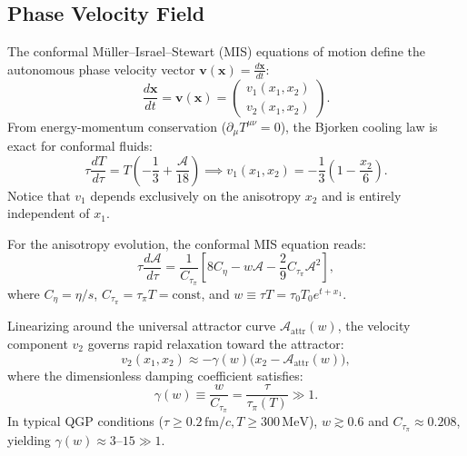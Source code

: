 \documentclass[11pt,a4paper]{article}
\begin{document}
\subsection{Phase Velocity Field}
The conformal Müller--Israel--Stewart (MIS) equations of motion define the autonomous phase velocity vector $\mathbf{v}(\mathbf{x}) = \frac{d\mathbf{x}}{dt}$:
\begin{equation}
    \frac{d\mathbf{x}}{dt} = \mathbf{v}(\mathbf{x}) = \begin{pmatrix} v_1(x_1, x_2) \\ v_2(x_1, x_2) \end{pmatrix}.
\end{equation}
From energy-momentum conservation ($\partial_\mu T^{\mu\nu} = 0$), the Bjorken cooling law is exact for conformal fluids:
\begin{equation}
    \tau \frac{dT}{d\tau} = T \left(-\frac{1}{3} + \frac{\mathcal{A}}{18}\right) \implies v_1(x_1, x_2) = -\frac{1}{3}\left(1 - \frac{x_2}{6}\right).
    \label{eq:v1_definition}
\end{equation}
Notice that $v_1$ depends exclusively on the anisotropy $x_2$ and is entirely independent of $x_1$.

For the anisotropy evolution, the conformal MIS equation reads:
\begin{equation}
    \tau \frac{d\mathcal{A}}{d\tau} = \frac{1}{C_{\tau_\pi}} \left[ 8 C_\eta - w \mathcal{A} - \frac{2}{9} C_{\tau_\pi} \mathcal{A}^2 \right],
    \label{eq:v2_exact}
\end{equation}
where $C_\eta = \eta/s$, $C_{\tau_\pi} = \tau_\pi T = \mathrm{const}$, and $w \equiv \tau T = \tau_0 T_0 e^{t + x_1}$. 

Linearizing around the universal attractor curve $\mathcal{A}_{\mathrm{attr}}(w)$, the velocity component $v_2$ governs rapid relaxation toward the attractor:
\begin{equation}
    v_2(x_1, x_2) \approx -\gamma(w)\big(x_2 - \mathcal{A}_{\mathrm{attr}}(w)\big),
    \label{eq:v2_linearized}
\end{equation}
where the dimensionless damping coefficient satisfies:
\begin{equation}
    \gamma(w) \equiv \frac{w}{C_{\tau_\pi}} = \frac{\tau}{\tau_\pi(T)} \gg 1.
\end{equation}
In typical QGP conditions ($\tau \ge 0.2\,\mathrm{fm}/c, T \ge 300\,\mathrm{MeV}$), $w \gtrsim 0.6$ and $C_{\tau_\pi} \approx 0.208$, yielding $\gamma(w) \approx 3$--$15 \gg 1$.
\end{document}
